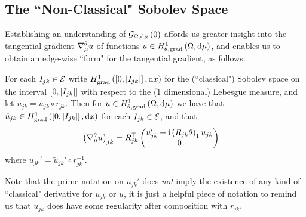 \subsection{The ``Non-Classical" Sobolev Space} \label{appS:SobSpacesTheory}
Establishing an understanding of $\mathcal{G}_{ \Omega, \mathrm{d}\mu}\left( 0 \right)$  affords us greater insight into the tangential gradient $\nabla^{\theta}_\mu u$ of functions $u\in H^1_{\theta, \mathrm{grad}}\left( \Omega, \mathrm{d}\mu \right)$, and enables us to obtain an edge-wise ``form" for the tangential gradient, as follows:
\begin{prop} \label{prop:GraphTangGrad}
	For each $I_{jk}\in \mathcal{E}$ write $H^1_\mathrm{grad}\left( \left[ 0,\left\lvert I_{jk} \right\rvert \right], \mathrm{d}x \right)$ for the (``classical") Sobolev space on the interval $\left[ 0,\left\lvert I_{jk} \right\rvert \right]$ with respect to the (1 dimensional) Lebesgue measure, and let $\tilde{u}_{jk} = u_{jk} \circ r_{jk}$.
	Then for $u\in H^1_{\theta, \mathrm{grad}}\left( \Omega, \mathrm{d}\mu \right)$ we have that $\tilde{u}_{jk}\in H^1_\mathrm{grad}\left( \left[ 0,\left\lvert I_{jk} \right\rvert \right], \mathrm{d}x \right)$ for each $I_{jk}\in \mathcal{E}$, and that
	\begin{align*}
		\left(  \nabla^{\theta}_\mu u  \right)_{jk} 
		&= R_{jk}^\top \begin{pmatrix} u_{jk}' + \mathrm{i}\left( R_{jk}\theta \right)_1 u_{jk} \\ 0	\end{pmatrix}
	\end{align*}
	where $u_{jk}' = \tilde{u}_{jk}' \circ r_{jk}^{-1}$.
\end{prop}
Note that the prime notation on $u_{jk}'$ does \emph{not} imply the existence of any kind of ``classical" derivative for $u_{jk}$ or $u$, it is just a helpful piece of notation to remind us that $u_{jk}$ does have some regularity after composition with $r_{jk}$.

